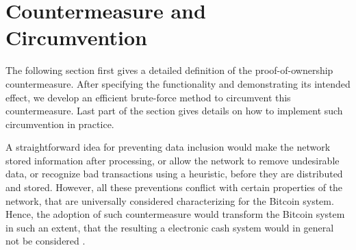 \documentclass[a4paper,11pt,titlepage]{scrbook}
\begin{document}



\chapter{Countermeasure and Circumvention}

The following section first gives a detailed definition of the proof-of-ownership countermeasure. After specifying the functionality and demonstrating its intended effect, we develop an efficient brute-force method to circumvent this countermeasure. Last part of the section gives details on how to implement such circumvention in practice.

A straightforward idea for preventing data inclusion would make the network  stored information after processing, or allow the network to remove undesirable data, or recognize bad transactions using a heuristic, before they are distributed and stored.
However, all these preventions conflict with certain properties of the network, that are universally considered characterizing for the Bitcoin system.
Hence, the adoption of such countermeasure would transform the Bitcoin system in such an extent, that the resulting a electronic cash system would in general not be considered .
\end{document}
